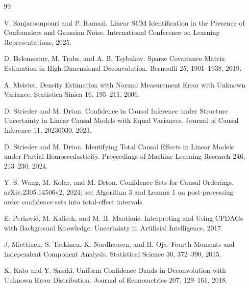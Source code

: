 \documentclass{article}
\begin{document}
\begin{thebibliography}{99}

   V. Sanjaroonpouri and P. Ramazi. Linear SCM Identification in the Presence of Confounders and Gaussian Noise. International Conference on Learning Representations, 2025.

   D. Belomestny, M. Trabs, and A. B. Tsybakov. Sparse Covariance Matrix Estimation in High-Dimensional Deconvolution. Bernoulli 25, 1901--1938, 2019.

   A. Meister. Density Estimation with Normal Measurement Error with Unknown Variance. Statistica Sinica 16, 195--211, 2006.

   D. Strieder and M. Drton. Confidence in Causal Inference under Structure Uncertainty in Linear Causal Models with Equal Variances. Journal of Causal Inference 11, 20230030, 2023.

   D. Strieder and M. Drton. Identifying Total Causal Effects in Linear Models under Partial Homoscedasticity. Proceedings of Machine Learning Research 246, 213--230, 2024.

   Y. S. Wang, M. Kolar, and M. Drton. Confidence Sets for Causal Orderings. arXiv:2305.14506v2, 2024; see Algorithm 3 and Lemma 1 on post-processing order confidence sets into total-effect intervals.

   E. Perkovi\'c, M. Kalisch, and M. H. Maathuis. Interpreting and Using CPDAGs with Background Knowledge. Uncertainty in Artificial Intelligence, 2017.

   J. Miettinen, S. Taskinen, K. Nordhausen, and H. Oja. Fourth Moments and Independent Component Analysis. Statistical Science 30, 372--390, 2015.

   K. Kato and Y. Sasaki. Uniform Confidence Bands in Deconvolution with Unknown Error Distribution. Journal of Econometrics 207, 129--161, 2018.

\end{thebibliography}
\end{document}
